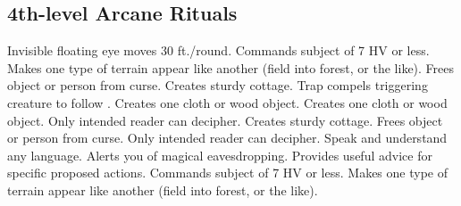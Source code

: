 \subsection{4th-level Arcane Rituals}
\begin{rituallist}
   Invisible floating eye moves 30 ft./round.
   Commands subject of 7 HV or less.
   Makes one type of terrain appear like another (field into forest, or the like).
   Frees object or person from curse.
   Creates sturdy cottage.
   Trap compels triggering creature to follow .
   Creates one cloth or wood object.
   Creates one cloth or wood object.
   Only intended reader can decipher.
   Creates sturdy cottage.
   Frees object or person from curse.
   Only intended reader can decipher.
   Speak and understand any language.
   Alerts you of magical eavesdropping.
   Provides useful advice for specific proposed actions.
   Commands subject of 7 HV or less.
   Makes one type of terrain appear like another (field into forest, or the like).
\end{rituallist}

